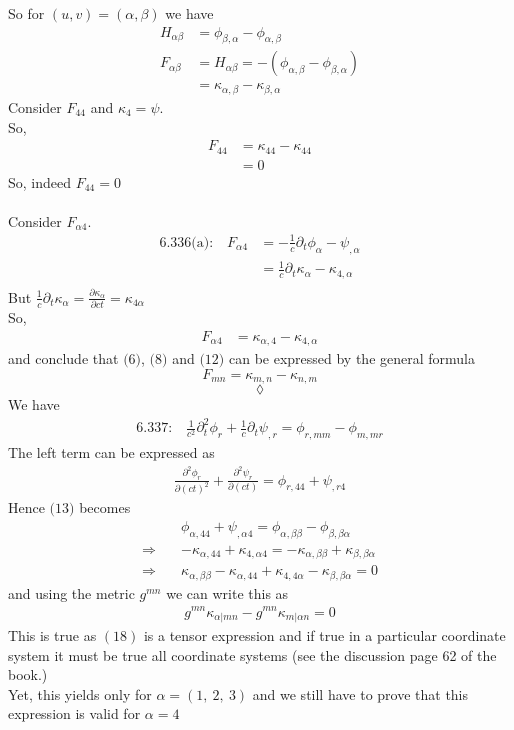 So for $(u,v) = (\alpha,\beta)$ we have 
\begin{align}
H_{\alpha\beta} &=\phi_{\beta,\alpha}-\phi_{\alpha,\beta}\\
F_{\alpha\beta} &= H_{\alpha\beta}= -\left(\phi_{\alpha,\beta}-\phi_{\beta,\alpha}\right)\\
&= \kappa_{\alpha,\beta}-\kappa_{\beta,\alpha}
\end{align}
Consider $F_{44}$ and $\kappa_4= \psi$.\\
So,
\begin{align}
F_{44} &= \kappa_{44}-\kappa_{44}\\
&=0
\end{align}
So, indeed $F_{44}=0$\\\\
Consider $F_{\alpha 4}$.\\
\begin{align}
\text{6.336(a):}\quad F_{\alpha 4} &= -\frac{1}{c}\partial_t \phi_{\alpha}-\psi_{,\alpha}\\
&= \frac{1}{c}\partial_t \kappa_{\alpha}-\kappa_{4,\alpha}\\
\end{align}
But $ \frac{1}{c}\partial_t \kappa_{\alpha}= \frac{\partial \kappa_{\alpha}}{\partial ct} =  \kappa_{4\alpha}$\\
So, 
\begin{align}
F_{\alpha 4} &=\kappa_{\alpha, 4} -\kappa_{4,\alpha}
\end{align}
and conclude that  $\text{(6)}$, $\text{(8)}$ and $\text{(12)}$ can be expressed by the general formula
$$F_{mn}= \kappa_{m,n}-\kappa_{n,m}$$
$$\lozenge$$
We have 
\begin{align}\text{6.337:}\quad \frac{1}{c^2}\partial^2_t \phi_r+\frac{1}{c}\partial_t\psi_{,r} = \phi_{r,mm}-\phi_{m,mr}
\end{align} 
The left term can be expressed as 
\begin{align}
\frac{\partial^2 \phi_r}{\partial (ct)^2}+\frac{\partial^2 \psi_r}{\partial (ct)}= \phi_{r,44}+\psi_{,r4}
\end{align}
Hence $\text{(13)}$ becomes
\begin{align}
&\phi_{\alpha,44}+\psi_{,\alpha 4}=\phi_{\alpha,\beta\beta}-\phi_{\beta,\beta\alpha}\\
\Rightarrow\quad & -\kappa_{\alpha,44}+\kappa_{4,\alpha 4}=-\kappa_{\alpha,\beta\beta}+\kappa_{\beta,\beta\alpha}\\
\Rightarrow\quad & \kappa_{\alpha,\beta\beta}-\kappa_{\alpha,44}+ \kappa_{4,4 \alpha}-\kappa_{\beta,\beta\alpha}=0
\end{align}
and using the metric $g^{mn}$ we can write this as 
\begin{align}
g^{mn}\kappa_{\alpha|mn}-g^{mn}\kappa_{m|\alpha n}=0
\end{align}
This is true as $(18)$ is a tensor expression and if true in a particular coordinate system it must be true all coordinate systems (see the discussion page 62 of the book.)\\
Yet, this yields only for $\alpha = (1,\ 2,\ 3)$ and we still have to prove that this expression is valid for $\alpha=4$

